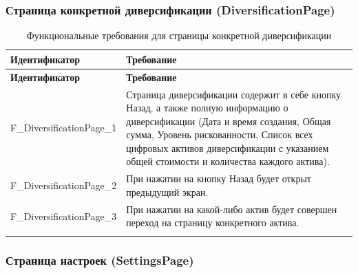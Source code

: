 \documentclass[a4paper, 14pt]{article}
\begin{document}
\subsubsection{Страница конкретной диверсификации (DiversificationPage)}

\begin{longtable}{| p{} | p{} |}
    \hline
    \textbf{Идентификатор}          & \textbf{Требование}                                                                                                                                                                \\
    \hline
    \endfirsthead
    \hline
    \textbf{Идентификатор}          & \textbf{Требование}                                                                                                                                                                \\
    \hline
    \endhead

    F\_DiversificationPage\_1       & Страница диверсификации содержит в себе кнопку Назад, а также полную информацию о диверсификации (Дата и время создания, Общая сумма, Уровень рискованности, Список всех цифровых активов диверсификации с указанием общей стоимости и количества каждого актива).      \\ \hline
    F\_DiversificationPage\_2       & При нажатии на кнопку Назад будет открыт предыдущий экран.                                                                                                                         \\ \hline
    F\_DiversificationPage\_3       & При нажатии на какой-либо актив будет совершен переход на страницу конкретного актива.                                                                                             \\ \hline

    \caption{Функциональные требования для страницы конкретной диверсификации}
\end{longtable}

\subsubsection{Страница настроек (SettingsPage)}
\end{document}
